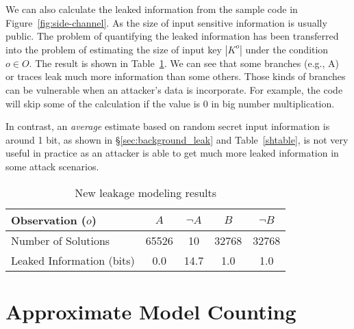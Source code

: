 We can also calculate the leaked information from the sample code in
Figure~\ref{fig:side-channel}. As the size of input sensitive information is
usually public. The problem of quantifying the leaked information has been
transferred into the problem of estimating the size of input key $|K^o|$ under
the condition $o \in O$. The result is shown in Table~\ref{shtable2}. We can see
that some branches (e.g., A) or traces leak much more information than some others. 
Those kinds of branches can be vulnerable when an attacker's data is incorporate. 
For example, the code will skip some of the calculation if the value is 0 in big 
number multiplication.

In
contrast, an \emph{average} estimate based on random secret input information is around
1 bit, as shown in \S\ref{sec:background_leak} and Table~\ref{shtable}, is
not very useful in practice as an attacker is able to get much more leaked
information in some attack scenarios.

\begin{table}[ht]
    \centering\small\footnotesize
    \caption{New leakage modeling results}
    \label{shtable2}
    \vspace*{-9pt}
    \begin{tabular}{l|cc|cc}
        \hline
      
        Observation ($o$)   & $A$ & $\neg A$ & $B$ & $\neg B$ \\ \hline
        Number of Solutions & 65526       & 10        & 32768     & 32768           \\ \hline
        Leaked Information (bits) & 0.0         & 14.7      & 1.0       & 1.0         \\
        \hline
    \end{tabular}
\end{table}
\section{Approximate Model Counting}
\label{MCreasons}


